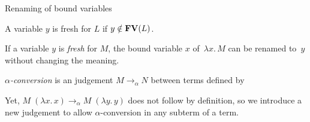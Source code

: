 \begin{frame}{Renaming of bound variables}
\begin{definition}[Freshness]
  A variable $y$ is \alert{fresh} for $L$ if $y \notin \FV(L)$.  
\end{definition}

If a variable $y$ is \emph{fresh} for $M$, the bound variable $x$ of~$\lambda
x.\, M$ can be renamed to~$y$ without changing the meaning. 
\begin{definition}
  \emph{$\alpha$-conversion} is an judgement $M \to_\alpha N$ between terms defined by
  \begin{prooftree}
  \end{prooftree}
\end{definition}

Yet, $M\;(\lambda x.\, x) \longrightarrow_\alpha M\;(\lambda y.\, y)$ does
not follow by definition, so we introduce a new judgement to allow
$\alpha$-conversion in any subterm of a term.

\end{frame}

